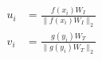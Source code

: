 \documentclass[border=6pt]{standalone}
\begin{document}
\color{ink}\begin{minipage}{165pt}\centering$\displaystyle \begin{aligned}u_i&=\frac{f(x_i)W_I}{\lVert f(x_i)W_I\rVert_2}\\[6pt]v_i&=\frac{g(y_i)W_T}{\lVert g(y_i)W_T\rVert_2}\end{aligned}$\end{minipage}
\end{document}
